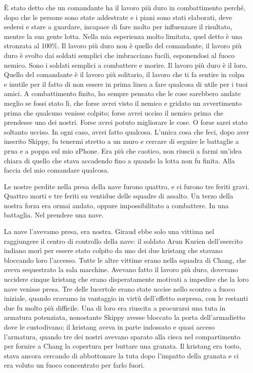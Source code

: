 È stato detto che un comandante ha il lavoro più duro in combattimento
perché, dopo che le persone sono state addestrate e i piani sono stati
elaborati, deve sedersi e stare a guardare, incapace di fare molto per
influenzare il risultato, mentre la sua gente lotta. Nella mia
esperienza molto limitata, quel detto è una stronzata al 100\%. Il
lavoro più duro non è quello del comandante, il lavoro più duro è svolto
dai soldati semplici che imbracciano fucili, esponendosi al fuoco
nemico. Sono i soldati semplici a combattere e morire. Il lavoro più
duro è il loro. Quello del comandante è il lavoro più solitario, il
lavoro che ti fa sentire in colpa e inutile per il fatto di non essere
in prima linea a fare qualcosa di utile per i tuoi amici. A
combattimento finito, ho sempre pensato che le cose sarebbero andate
meglio se fossi stato lì, che forse avrei visto il nemico e gridato un
avvertimento prima che qualcuno venisse colpito; forse avrei ucciso il
nemico prima che prendesse uno dei nostri. Forse avrei potuto migliorare
le cose. O forse sarei stato soltanto ucciso. In ogni caso, avrei fatto
qualcosa. L'unica cosa che feci, dopo aver inserito Skippy, fu tenermi
stretto a un muro e cercare di seguire le battaglie a prua e a poppa sul
mio zPhone. Era più che caotico, non riuscii a farmi un'idea chiara di
quello che stava accadendo fino a quando la lotta non fu finita. Alla
faccia del mio comandare qualcosa.

Le nostre perdite nella presa della nave furono quattro, e ci furono tre
feriti gravi. Quattro morti e tre feriti su ventidue delle squadre di
assalto. Un terzo della nostra forza era ormai andato, oppure
impossibilitato a combattere. In una battaglia. Nel prendere una nave.

La nave l'avevamo presa, era nostra. Giraud ebbe solo una vittima nel
raggiungere il centro di controllo della nave: il soldato Arun Kurien
dell'esercito indiano morì per essere stato colpito da uno dei due
kristang che stavano bloccando loro l'accesso. Tutte le altre vittime
erano nella squadra di Chang, che aveva sequestrato la sala macchine.
Avevano fatto il lavoro più duro, dovevano uccidere cinque kristang che
erano disperatamente motivati a impedire che la loro nave venisse presa.
Tre delle lucertole erano state uccise nello scontro a fuoco iniziale,
quando eravamo in vantaggio in virtù dell'effetto sorpresa, con le
restanti due fu molto più difficile. Una di loro era riuscita a
procurarsi una tuta in armatura potenziata, nonostante Skippy avesse
bloccato la porta dell'armadietto dove le custodivano; il kristang aveva
in parte indossato e quasi acceso l'armatura, quando tre dei nostri
avevano sparato alla cieca nel compartimento per fornire a Chang la
copertura per buttare una granata. Il kristang era tosto, stava ancora
cercando di abbottonare la tuta dopo l'impatto della granata e ci era
voluto un fuoco concentrato per farlo fuori.


